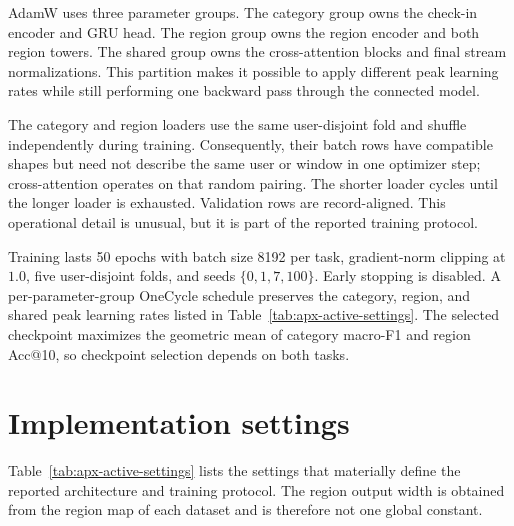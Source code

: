 AdamW uses three parameter groups. The category group owns the check-in encoder and
GRU head. The region group owns the region encoder and both region towers. The
shared group owns the cross-attention blocks and final stream normalizations. This
partition makes it possible to apply different peak learning rates while still
performing one backward pass through the connected model.

The category and region loaders use the same user-disjoint fold and shuffle
independently during training. Consequently, their batch rows have compatible
shapes but need not describe the same user or window in one optimizer step;
cross-attention operates on that random pairing. The shorter loader cycles until
the longer loader is exhausted. Validation rows are record-aligned. This
operational detail is unusual, but it is part of the reported training protocol.

Training lasts 50 epochs with batch size 8192 per task, gradient-norm clipping at
$1.0$, five user-disjoint folds, and seeds $\{0,1,7,100\}$. Early stopping is
disabled. A per-parameter-group OneCycle schedule preserves the category, region,
and shared peak learning rates listed in Table~\ref{tab:apx-active-settings}. The
selected checkpoint maximizes the geometric mean of category macro-F1 and region
Acc@10, so checkpoint selection depends on both tasks.

\section{Implementation settings}
\label{sec:apx-methods-specification}

Table~\ref{tab:apx-active-settings} lists the settings that materially define the
reported architecture and training protocol. The region output width is obtained
from the region map of each dataset and is therefore not one global constant.

